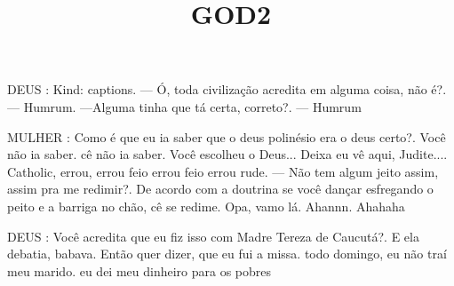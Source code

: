 \documentclass[10pt]{article}
\author{}
\title{\vspace{-3.5cm}GOD2}
\date{}
\newcommand{\mychar}[1]{
  \bigskip
  \hspace{-2em} \MakeUppercase{#1}
}
\begin{document}
\maketitle



\mychar{DEUS}: Kind: captions. — Ó, toda civilização acredita em alguma coisa, não é?. — Humrum. —Alguma tinha que tá certa, correto?. — Humrum

\mychar{MULHER}: Como é que eu ia saber que o deus polinésio era o deus certo?. Você não ia saber. cê não ia saber. Você escolheu o Deus... Deixa eu vê aqui, Judite.... Catholic, errou, errou feio errou feio errou rude. — Não tem algum jeito assim, assim pra me redimir?. De acordo com a doutrina se você dançar esfregando  o peito e a barriga no chão, cê se redime. Opa, vamo lá. Ahannn. Ahahaha

\mychar{DEUS}: Você acredita que eu fiz isso com Madre Tereza de Caucutá?. E ela debatia, babava. Então quer dizer, que eu fui a missa. todo domingo, eu não traí meu marido. eu dei meu dinheiro para os pobres
\end{document}
